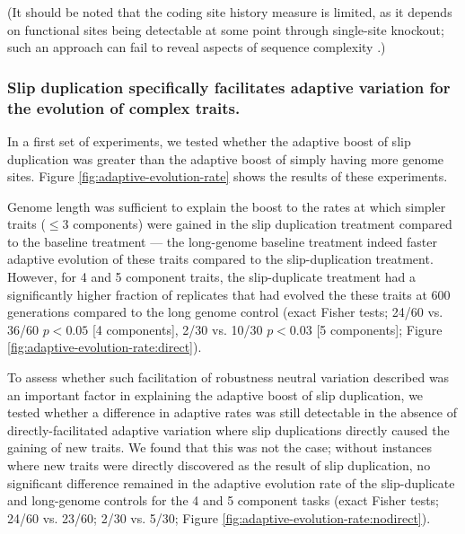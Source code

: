 (It should be noted that the coding site history measure is limited, as it depends on functional sites being detectable at some point through single-site knockout; such an approach can fail to reveal aspects of sequence complexity \citep{moreno2024cryptic}.)

\subsubsection{Slip duplication specifically facilitates adaptive variation for the evolution of complex traits.}



In a first set of experiments, we tested whether the adaptive boost of slip duplication was greater than the adaptive boost of simply having more genome sites.
Figure \ref{fig:adaptive-evolution-rate} shows the results of these experiments.

Genome length was sufficient to explain the boost to the rates at which simpler traits ($\leq 3$ components) were gained in the slip duplication treatment compared to the baseline treatment --- the long-genome baseline treatment indeed faster adaptive evolution of these traits compared to the slip-duplication treatment.
However, for 4 and 5 component traits, the slip-duplicate treatment had a significantly higher fraction of replicates that had evolved the these traits at 600 generations compared to the long genome control (exact Fisher tests; 24/60 vs. 36/60 $p<0.05$ [4 components], 2/30 vs. 10/30 $p < 0.03$ [5 components]; Figure \ref{fig:adaptive-evolution-rate:direct}).

To assess whether such facilitation of robustness neutral variation described  was an important factor in explaining the adaptive boost of slip duplication, we tested whether a difference in adaptive rates was still detectable in the absence of directly-facilitated adaptive variation where slip duplications directly caused the gaining of new traits.
We found that this was not the case; without instances where new traits were directly discovered as the result of slip duplication, no significant difference remained in the adaptive evolution rate of the slip-duplicate and long-genome controls for the 4 and 5 component tasks (exact Fisher tests; 24/60 vs. 23/60; 2/30 vs. 5/30; Figure \ref{fig:adaptive-evolution-rate:nodirect}).

